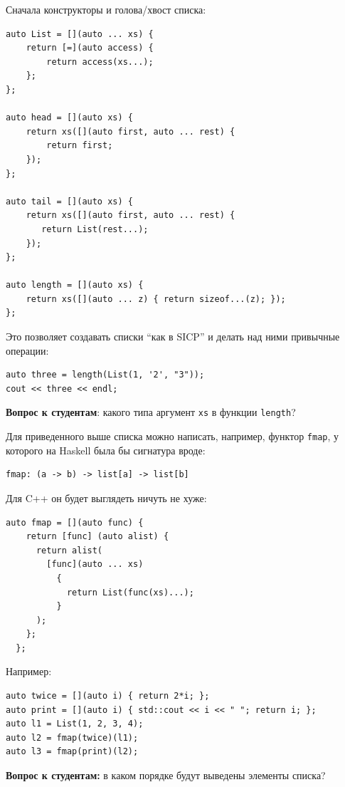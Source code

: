 \documentclass[a4paper,12pt,oneside]{book}
\newif\ifanswers
\begin{document}
Сначала конструкторы и голова/хвост списка:

\begin{lstlisting}
auto List = [](auto ... xs) {
    return [=](auto access) { 
        return access(xs...); 
    };
};

auto head = [](auto xs) {
    return xs([](auto first, auto ... rest) { 
        return first; 
    });
};

auto tail = [](auto xs) {
    return xs([](auto first, auto ... rest) { 
       return List(rest...); 
    });
};

auto length = [](auto xs) {
    return xs([](auto ... z) { return sizeof...(z); });
};
\end{lstlisting}

Это позволяет создавать списки ``как в SICP'' и делать над ними привычные операции:

\begin{lstlisting}
auto three = length(List(1, '2', "3")); 
cout << three << endl;
\end{lstlisting}

\textbf{Вопрос к студентам}: какого типа аргумент \lstinline!xs! в функции \lstinline!length!?

\ifanswers
Правильный ответ: \lstinline!std::function!
\fi

Для приведенного выше списка можно написать, например, функтор \lstinline!fmap!, у которого на Haskell была бы сигнатура вроде:

\begin{verbatim}
fmap: (a -> b) -> list[a] -> list[b]
\end{verbatim}

Для C++ он будет выглядеть ничуть не хуже:

\begin{lstlisting}
auto fmap = [](auto func) {
    return [func] (auto alist) {
      return alist(
        [func](auto ... xs)
          {
            return List(func(xs)...);  
          }
      );
    };
  };
\end{lstlisting}

Например:

\begin{lstlisting}
auto twice = [](auto i) { return 2*i; };
auto print = [](auto i) { std::cout << i << " "; return i; };
auto l1 = List(1, 2, 3, 4);
auto l2 = fmap(twice)(l1);
auto l3 = fmap(print)(l2);
\end{lstlisting}

\textbf{Вопрос к студентам:} в каком порядке будут выведены элементы списка?
\end{document}
